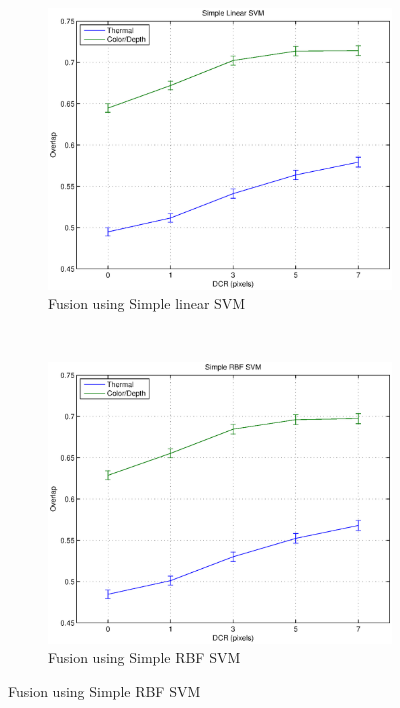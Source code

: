 \documentclass[10pt,twocolumn,letterpaper]{article}
\begin{document}
\begin{figure}[H]
	 \\
	\begin{subfigure}[b]{0.47\textwidth}
 		\includegraphics[width=1\textwidth]{results/simplelinearsvm.eps} 			
		\caption{Fusion using Simple linear SVM}
    		\label{fig:simplelinearsvm}
 	\end{subfigure}
	~
	\begin{subfigure}[b]{0.47\textwidth}
 		\includegraphics[width=1\textwidth]{results/simplerbfsvm.eps} 			
		\caption{Fusion using Simple RBF SVM}
    		\label{fig:simplerbfsvm}
 	\end{subfigure}

\end{figure}
\end{document}
